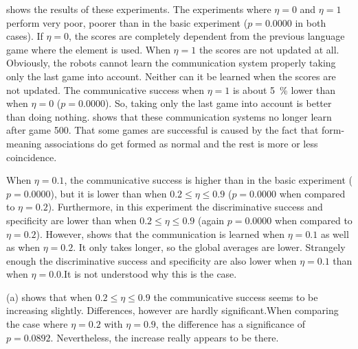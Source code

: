  shows the results of these experiments. The experiments where $\eta=0$ and $\eta=1$ perform very poor, poorer than in the basic experiment ($p=0.0000$ in both cases). If $\eta=0$, the scores are completely dependent from the previous language game where the element is used. When $\eta=1$ the scores are not updated at all. Obviously, the robots cannot learn the communication system properly taking only the last game into account. Neither can it be learned when the scores are not updated. The communicative success when $\eta=1$ is about 5~\% lower than when $\eta=0$ ($p=0.0000$). So, taking only the last game into account is better than doing nothing.  shows that these communication systems no longer learn after game 500. That some games are successful is caused by the fact that form-meaning associations do get formed as normal and the rest is more or less coincidence.

When $\eta=0.1$, the communicative success is higher than in the basic experiment ($p=0.0000$), but it is lower than when $0.2\leq\eta\leq0.9$ ($p=0.0000$ when compared to $\eta=0.2$). Furthermore, in this experiment the discriminative success and specificity are lower than when $0.2\leq\eta\leq0.9$ (again $p=0.0000$ when compared to $\eta=0.2$). However,  shows that the communication is learned when $\eta=0.1$ as well as when $\eta=0.2$. It only takes longer, so the global averages are lower. Strangely enough the discriminative success and specificity are also lower when $\eta=0.1$ than when $\eta=0.0$.It is not understood why this is the case.

 (a) shows that  when $0.2 \leq \eta \leq 0.9$ the communicative success seems to be increasing slightly. Differences, however are hardly significant.\linebreak When comparing the case where $\eta=0.2$ with $\eta=0.9$, the difference has a significance of $p=0.0892$. Nevertheless, the increase really appears to be there.\enlargethispage{2\baselineskip}

